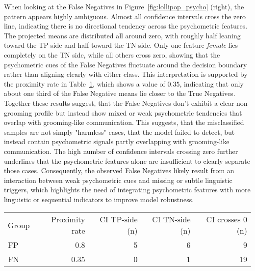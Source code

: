 When looking at the False Negatives in Figure~\ref{fig:lollipop_psycho} (right), the pattern appears highly ambiguous. Almost all confidence intervals cross the zero line, indicating there is no directional tendency across the psychometric features. The projected means are distributed all around zero, with roughly half leaning toward the TP side and half toward the TN side. Only one feature \textit{female} lies completely on the TN side, while all others cross zero, showing that the psychometric cues of the False Negatives fluctuate around the decision boundary rather than aligning clearly with either class. This interpretation is supported by the proximity rate in Table~\ref{tab:proximity_key_results_psycho}, which shows a value of $0.35$, indicating that only about one third of the False Negative means lie closer to the True Negatives.  Together these results suggest, that the False Negatives don't exhibit a clear non-grooming profile but instead show mixed or weak psychometric tendencies that overlap with grooming-like communication. This suggests, that the misclassified samples are not simply "harmless" cases, that the model failed to detect, but instead contain psychometric signals partly overlapping with grooming-like communication. The high number of confidence intervals crossing zero further underlines that the psychometric features alone are insufficient to clearly separate those cases. Consequently, the observed False Negatives likely result from an interaction between weak psychometric cues and missing or subtle linguistic triggers, which highlights the need of integrating psychometric features with more linguistic or sequential indicators to improve model robustness.


\begin{table}[H]
\centering
{}
\label{tab:proximity_key_results_psycho}
\begin{tabular}{@{}lrrrr@{}}
\toprule
Group & Proximity rate & CI TP-side (n) & CI TN-side (n) & CI crosses 0 (n) \\
\cmidrule(lr){2-5}
FP & 0.8 & 5 & 6 & 9 \\
FN & 0.35 & 0 & 1 & 19 \\
\bottomrule
\end{tabular}
\end{table}









